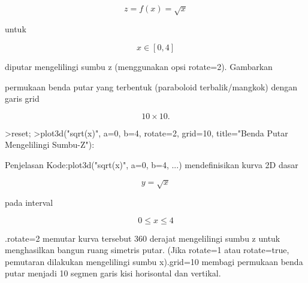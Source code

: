 \documentclass[a4paper,10pt]{article}
\begin{document}
\begin{eulernotebook}
\begin{eulerformula}
\[
z = f(x) = \sqrt{x}
\]
\end{eulerformula}
\begin{eulerttcomment}
 untuk 
\end{eulerttcomment}
\begin{eulerformula}
\[
x \in [0, 4]
\]
\end{eulerformula}
\begin{eulerttcomment}
 diputar mengelilingi sumbu z (menggunakan opsi rotate=2). Gambarkan
\end{eulerttcomment}
\begin{eulercomment}
permukaan benda putar yang terbentuk (paraboloid terbalik/mangkok)
dengan garis grid \\
\end{eulercomment}
\begin{eulerformula}
\[
10 \times 10.
\]
\end{eulerformula}
\begin{eulerprompt}
>reset;
>plot3d("sqrt(x)", a=0, b=4, rotate=2, grid=10, title="Benda Putar Mengelilingi Sumbu-Z"):
\end{eulerprompt}
\begin{eulercomment}
Penjelasan Kode:plot3d("sqrt(x)", a=0, b=4, ...) mendefinisikan kurva
2D dasar\\
\end{eulercomment}
\begin{eulerformula}
\[
y = \sqrt{x}
\]
\end{eulerformula}
\begin{eulercomment}
pada interval\\
\end{eulercomment}
\begin{eulerformula}
\[
0 \le x \le 4
\]
\end{eulerformula}
\begin{eulercomment}
.rotate=2 memutar kurva tersebut 360 derajat mengelilingi sumbu z
untuk menghasilkan bangun ruang simetris putar. (Jika rotate=1 atau
rotate=true, pemutaran dilakukan mengelilingi sumbu x).grid=10 membagi
permukaan benda putar menjadi 10 segmen garis kisi horisontal dan
vertikal.
\end{eulercomment}
\end{eulernotebook}
\end{document}
